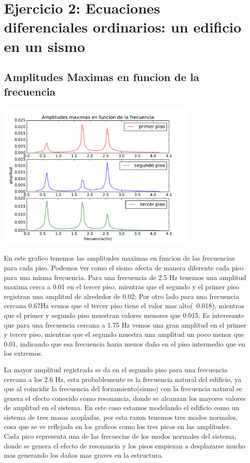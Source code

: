 \documentclass[11pt,letterpaper]{exam}
\begin{document}
\section{Ejercicio 2: Ecuaciones diferenciales ordinarios: un edificio en un sismo}

\subsection{Amplitudes Maximas en funcion de la frecuencia}
\begin{center}
\includegraphics[width=10cm]{amp_max_edificio.pdf} 
\end{center}
En este grafico tenemos las amplitudes maximas en funcion de las frecuencias para cada piso. Podemos ver como el sismo afecta de manera diferente cada piso para una misma frecuencia. Para una frecuencia de 2.5 Hz tenemos una amplitud maxima cerca a 0.01 en el tercer piso, mientras que el segundo y el primer piso registran una amplitud de alrededor de 0.02; Por otro lado para una frecuencia cercana 0.67Hz vemos que el tercer piso tiene el valor mas alto(~0.018), mientras que el primer y segundo piso muestran valores menores que 0.015. Es interesante que para una frecuencia cercana a 1.75 Hz vemos una gran amplitud en el primer y tercer piso, mientras que el segundo muestra una amplitud un poco menor que 0.01, indicando que esa frecuencia haria menos daño en el piso intermedio que en los extremos. 

La mayor amplitud registrada se da en el segundo piso para una frecuencia cercana a los 2.6 Hz, esta probablemente es la frecuencia natural del edificio, ya que al coincidir la frecuencia del forzamiento(sismo) con la frecuencia natural se genera el efecto conocido como resonancia, donde se alcanzan los mayores valores de amplitud en el sistema. En este caso estamos modelando el edificio como un sistema de tres masas acopladas, por esta razon tenemos tres modos normales, cosa que se ve reflejada en los graficos como los tres picos en las amplitudes. Cada pico representa una de las frecuecias de los modos normales del sistema, donde se genera el efecto de resonancia y los pisos empiezan a desplazarse mucho mas generando los daños mas graves en la estructura.
\end{document}
